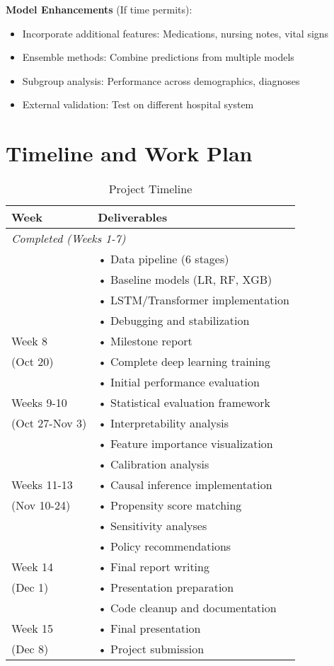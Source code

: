 \documentclass[conference]{IEEEtran}
\begin{document}
\textbf{Model Enhancements} (If time permits):
\begin{itemize}
    \item Incorporate additional features: Medications, nursing notes, vital signs
    \item Ensemble methods: Combine predictions from multiple models
    \item Subgroup analysis: Performance across demographics, diagnoses
    \item External validation: Test on different hospital system
\end{itemize}

\section{Timeline and Work Plan}

\begin{table}[h]
\centering
\caption{Project Timeline}
\label{tab:timeline}
\small
\begin{tabular}{p{2.5cm}p{5cm}}
\toprule
\textbf{Week} & \textbf{Deliverables} \\
\midrule
\multicolumn{2}{l}{\textit{Completed (Weeks 1-7)}} \\
& • Data pipeline (6 stages) \\
& • Baseline models (LR, RF, XGB) \\
& • LSTM/Transformer implementation \\
& • Debugging and stabilization \\
\midrule
Week 8 & • Milestone report \\
(Oct 20) & • Complete deep learning training \\
& • Initial performance evaluation \\
\midrule
Weeks 9-10 & • Statistical evaluation framework \\
(Oct 27-Nov 3) & • Interpretability analysis \\
& • Feature importance visualization \\
& • Calibration analysis \\
\midrule
Weeks 11-13 & • Causal inference implementation \\
(Nov 10-24) & • Propensity score matching \\
& • Sensitivity analyses \\
& • Policy recommendations \\
\midrule
Week 14 & • Final report writing \\
(Dec 1) & • Presentation preparation \\
& • Code cleanup and documentation \\
\midrule
Week 15 & • Final presentation \\
(Dec 8) & • Project submission \\
\bottomrule
\end{tabular}
\end{table}
\end{document}
